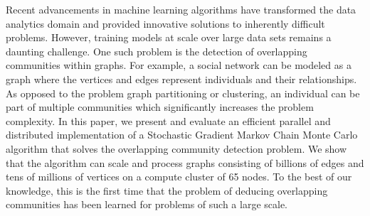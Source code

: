 
Recent advancements in machine learning algorithms have transformed the data
analytics domain and provided innovative solutions to inherently difficult
problems. However, training models at scale over large data sets remains a
daunting challenge. One such problem is the detection of overlapping
communities within graphs. For example, a social network can be modeled as a
graph where the vertices and edges represent individuals and their
relationships. As opposed to the problem graph partitioning or clustering, an
individual can be part of multiple communities which significantly increases
the problem complexity.
In this paper, we present and evaluate an efficient parallel and
distributed implementation of a Stochastic Gradient Markov Chain Monte Carlo
algorithm that solves the overlapping community detection problem. We show that
the algorithm can scale and process graphs consisting of billions of edges and
tens of millions of vertices on a compute cluster of 65 nodes. To the best of
our knowledge, this is the first time that the problem of deducing overlapping
communities has been learned for problems of such a large scale.

